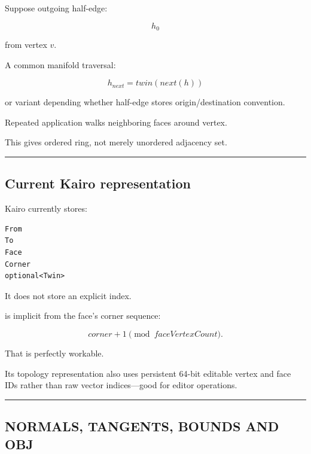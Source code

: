 \hypertarget{04-visual-computing-ii-ch041-one-ring-traversal}{}

Suppose outgoing half-edge:

\[
h_0
\]

from vertex \(v\).

A common manifold traversal:

\[
\boxed{
h_{next}
=
twin(next(h))
}
\]

or variant depending whether half-edge stores origin/destination convention.

Repeated application walks neighboring faces around vertex.

This gives ordered ring, not merely unordered adjacency set.

\begin{center}\rule{0.5\linewidth}{0.5pt}\end{center}

\subsection{Current Kairo representation}\label{04-visual-computing-ii-ch041-current-kairo-representation}

\hypertarget{04-visual-computing-ii-ch041-current-kairo-representation}{}

Kairo  currently stores:

\begin{verbatim}
From
To
Face
Corner
optional<Twin>
\end{verbatim}

It does not store an explicit  index.

 is implicit from the face's corner sequence:

\[
corner+1\pmod{faceVertexCount}.
\]

That is perfectly workable.

Its topology representation also uses persistent 64-bit editable vertex and face IDs rather than raw vector indices---good for editor operations.

\begin{center}\rule{0.5\linewidth}{0.5pt}\end{center}

\subsection{NORMALS, TANGENTS, BOUNDS AND OBJ}\label{04-visual-computing-ii-ch041-normals-tangents-bounds-and-obj}

